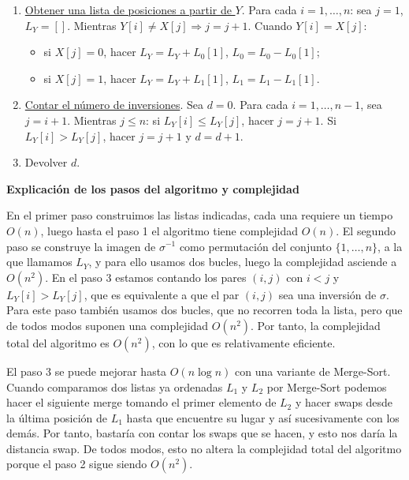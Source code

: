 \documentclass[twoside]{article}
\begin{document}
\begin{solucion}
\begin{enumerate}
\item  \underline{Obtener una lista de posiciones a partir de $Y$}. Para cada $i=1,\dots, n$: sea $j=1$, $L_Y=[]$. Mientras $ Y[i]\neq X[j]\Rightarrow j=j+1$. Cuando $Y[i]=X[j]$:
\begin{itemize}
\item si $X[j]=0$, hacer $L_Y= L_Y+L_0[1]$, $L_0= L_0-L_0[1]$;
\item si $X[j]=1$, hacer $L_Y= L_Y+L_1[1]$, $L_1= L_1-L_1[1]$.
\end{itemize}  

\item \underline{Contar el número de inversiones}. Sea $d=0$. Para cada $i=1,\dots, n-1$, sea $j=i+1$. Mientras $j\leq n$: si $L_Y[i]\leq L_Y[j]$, hacer $j=j+1$. Si $L_Y[i]> L_Y[j]$, hacer $j=j+1$ y $d=d+1$.  

\item Devolver $d$. 
\end{enumerate}

\vspace{0.8cm}

\textbf{Explicación de los pasos del algoritmo y complejidad}

En el primer paso construimos las listas indicadas, cada una requiere un tiempo $O(n)$, luego hasta el paso 1 el algoritmo tiene complejidad $O(n)$. 
El segundo paso se construye la imagen de $\sigma^{-1}$ como permutación del conjunto $\{1,\dots, n\}$, a la que llamamos $L_Y$, y para ello usamos dos bucles, luego la complejidad asciende a $O(n^2)$. En el paso 3 estamos contando los pares $(i,j)$ con $i<j$ y $L_Y[i]>L_Y[j]$, que es equivalente a que el par $(i,j)$ sea una inversión de $\sigma$. Para este paso también usamos dos bucles, que no recorren toda la lista, pero que de todos modos suponen una complejidad $O(n^2)$. Por tanto, la complejidad total del algoritmo es $O(n^2)$, con lo que es relativamente eficiente. 

\begin{nota}
El paso 3 se puede mejorar hasta $O(n\log n)$ con una variante de Merge-Sort. Cuando comparamos dos listas ya ordenadas $L_1$ y $L_2$ por Merge-Sort podemos hacer el siguiente merge tomando el primer elemento de $L_2$ y hacer swaps desde la última posición de $L_1$ hasta que encuentre su lugar y así sucesivamente con los demás. Por tanto, bastaría con contar los swaps que se hacen, y esto nos daría la distancia swap. De todos modos, esto no altera la complejidad total del algoritmo porque el paso 2 sigue siendo $O(n^2)$. 
\end{nota}


\end{solucion}
\end{document}
